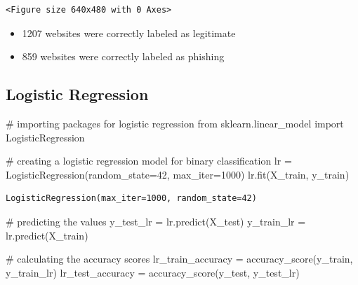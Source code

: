 \documentclass[
  letterpaper,
  DIV=11,
  numbers=noendperiod]{scrartcl}
\newenvironment{Shaded}{\begin{snugshade}}{\end{snugshade}}
\newcommand{\CommentTok}[1]{\textcolor[rgb]{0.37,0.37,0.37}{#1}}
\newcommand{\DecValTok}[1]{\textcolor[rgb]{0.68,0.00,0.00}{#1}}
\newcommand{\ImportTok}[1]{\textcolor[rgb]{0.00,0.46,0.62}{#1}}
\newcommand{\NormalTok}[1]{\textcolor[rgb]{0.00,0.23,0.31}{#1}}
\newcommand{\OperatorTok}[1]{\textcolor[rgb]{0.37,0.37,0.37}{#1}}
\providecommand{\tightlist}{%
  \setlength{\itemsep}{0pt}\setlength{\parskip}{0pt}}\usepackage{longtable,booktabs,array}
\begin{document}
\begin{verbatim}
<Figure size 640x480 with 0 Axes>
\end{verbatim}

\begin{itemize}
\tightlist
\item
  1207 websites were correctly labeled as legitimate
\item
  859 websites were correctly labeled as phishing
\end{itemize}

\hypertarget{logistic-regression}{%
\subsection{Logistic Regression}\label{logistic-regression}}

\begin{Shaded}
\begin{Highlighting}[]
\CommentTok{\# importing packages for logistic regression}
\ImportTok{from}\NormalTok{ sklearn.linear\_model }\ImportTok{import}\NormalTok{ LogisticRegression}

\CommentTok{\# creating a logistic regression model for binary classification}
\NormalTok{lr }\OperatorTok{=}\NormalTok{ LogisticRegression(random\_state}\OperatorTok{=}\DecValTok{42}\NormalTok{, max\_iter}\OperatorTok{=}\DecValTok{1000}\NormalTok{)}
\NormalTok{lr.fit(X\_train, y\_train)}
\end{Highlighting}
\end{Shaded}

\begin{verbatim}
LogisticRegression(max_iter=1000, random_state=42)
\end{verbatim}

\begin{Shaded}
\begin{Highlighting}[]
\CommentTok{\# predicting the values}
\NormalTok{y\_test\_lr }\OperatorTok{=}\NormalTok{ lr.predict(X\_test)}
\NormalTok{y\_train\_lr }\OperatorTok{=}\NormalTok{ lr.predict(X\_train)}
\end{Highlighting}
\end{Shaded}

\begin{Shaded}
\begin{Highlighting}[]
\CommentTok{\# calculating the accuracy scores}
\NormalTok{lr\_train\_accuracy }\OperatorTok{=}\NormalTok{ accuracy\_score(y\_train, y\_train\_lr)}
\NormalTok{lr\_test\_accuracy }\OperatorTok{=}\NormalTok{ accuracy\_score(y\_test, y\_test\_lr)}
\end{Highlighting}
\end{Shaded}
\end{document}
